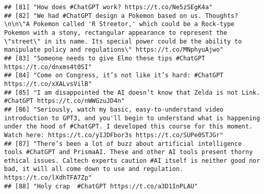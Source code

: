 \documentclass[
]{article}
\begin{document}
\begin{verbatim}
## [81] "How does #ChatGPT work? https://t.co/Ne5zSEgK4a"                                                                                                                                                                                                                                                                                      
## [82] "We had #ChatGPT design a Pokemon based on us. Thoughts?\n\n\"A Pokemon called 'R Streetor,' which could be a Rock-type Pokemon with a stony, rectangular appearance to represent the \"street\" in its name. Its special power could be the ability to manipulate policy and regulations\" https://t.co/MNphyuAjwo"                   
## [83] "Someone needs to give Elmo these tips #ChatGPT https://t.co/dnxms4t0SI"                                                                                                                                                                                                                                                               
## [84] "Come on Congress, it’s not like it’s hard: #ChatGPT https://t.co/xXALvsVilB"                                                                                                                                                                                                                                                          
## [85] "I am disappointed the AI doesn’t know that Zelda is not Link. #ChatGPT https://t.co/nWWGzuJD4n"                                                                                                                                                                                                                                       
## [86] "Seriously, watch my basic, easy-to-understand video introduction to GPT3, and you'll begin to understand what is happening under the hood of #ChatGPT. I developed this course for this moment. Watch here: https://t.co/yIJDFbor3s https://t.co/SUPe0STJGr"                                                                          
## [87] "There’s been a lot of buzz about artificial intelligence tools #ChatGPT and PrismaAI. These and other AI tools present thorny ethical issues. Caltech experts caution #AI itself is neither good nor bad, it will all come down to use and regulation. https://t.co/lXdhTFA7Zp"                                                       
## [88] "Holy crap  #ChatGPT https://t.co/a3D1InPLAU"                                                                                                                                                                                                                                                                                          

\end{verbatim}
\end{document}
